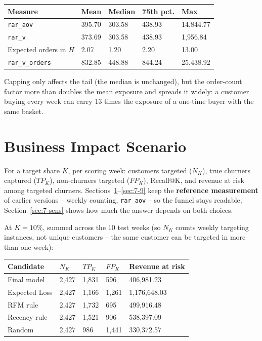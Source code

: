 \begin{center}
\begin{tabular}{@{}p{3.6cm}p{1.8cm}p{1.8cm}p{1.8cm}p{2.2cm}@{}}
    \toprule
    Measure & Mean & Median & 75th pct. & Max \\
    \midrule
    \texttt{rar\_aov} & 395.70 & 303.58 & 438.93 & 14,844.77 \\
    \texttt{rar\_v} & 373.69 & 303.58 & 438.93 & 1,956.84 \\
    Expected orders in $H$ & 2.07 & 1.20 & 2.20 & 13.00 \\
    \texttt{rar\_v\_orders} & 832.85 & 448.88 & 844.24 & 25,438.92 \\
    \bottomrule
\end{tabular}
\end{center}

Capping only affects the tail (the median is unchanged), but the order-count factor more than doubles the mean exposure and spreads it widely: a customer buying every week can carry 13 times the exposure of a one-time buyer with the same basket.

\section{Business Impact Scenario}
\label{sec:7-6}

For a target share $K$, per scoring week: customers targeted ($N_K$), true churners captured ($TP_K$), non-churners targeted ($FP_K$), Recall@K, and revenue at risk among targeted churners. Sections~\ref{sec:7-6}--\ref{sec:7-9} keep the \textbf{reference measurement} of earlier versions -- weekly counting, \texttt{rar\_aov} -- so the funnel stays readable; Section~\ref{sec:7-sens} shows how much the answer depends on both choices.

At $K=10\%$, summed across the 10 test weeks (so $N_K$ counts weekly targeting instances, not unique customers -- the same customer can be targeted in more than one week):

\begin{center}
\begin{tabular}{@{}p{2.8cm}p{1.6cm}p{1.6cm}p{1.6cm}p{2.8cm}@{}}
    \toprule
    Candidate & $N_K$ & $TP_K$ & $FP_K$ & Revenue at risk \\
    \midrule
    Final model & 2,427 & 1,831 & 596 & 406,981.23 \\
    Expected Loss & 2,427 & 1,166 & 1,261 & 1,176,648.03 \\
    RFM rule & 2,427 & 1,732 & 695 & 499,916.48 \\
    Recency rule & 2,427 & 1,521 & 906 & 538,397.09 \\
    Random & 2,427 & 986 & 1,441 & 330,372.57 \\
    \bottomrule
\end{tabular}
\end{center}

